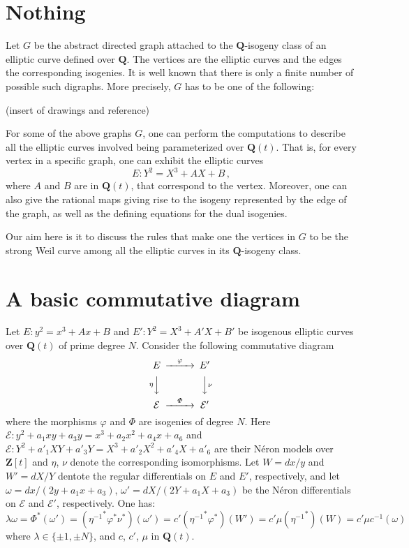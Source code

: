 \documentclass[
  journal=small,
  manuscript=article-type,  %
  year=2020,
  volume=37,
]{cup-journal}
\begin{document}
\section{Nothing}


Let $G$ be the abstract directed graph attached to the $\mathbf Q$-isogeny class of an elliptic curve defined over $\mathbf Q$. The vertices are the elliptic curves and the edges the
corresponding isogenies. It is well known that there is only a finite number of possible such digraphs. More precisely, $G$ has to be one of the following:

(insert of drawings and reference)

For some of the above graphs $G$, one can perform the computations to describe all the elliptic curves involved being parameterized over $\mathbf{Q}(t)$. That is, for every vertex in a specific graph, one can exhibit the elliptic curves
$$
E\colon Y^2 = X^3 + A X + B\,,
$$
where $A$ and $B$ are in $\mathbf{Q}(t)$, that correspond to the vertex. Moreover, one can also give the rational maps giving rise to the isogeny represented by the edge of the graph, as well as the defining equations for the dual isogenies.

Our aim here is it to discuss the rules that make one the vertices in $G$ to be the strong Weil curve among all the elliptic curves in its $\mathbf Q$-isogeny class.

\section{A basic commutative diagram}

Let $E\colon y^2 = x^3+A x+B$ and $E'\colon Y^2 = X^3+A' X+B'$ be isogenous elliptic curves over $\mathbf{Q}(t)$ of prime degree $N$.
Consider the following commutative diagram
\begin{equation}
\begin{CD}
E
 @>\varphi>>
 E'\\
@V{\eta}VV
 @VV{\nu}V\\
{\mathcal E}
 @>\varPhi>> 
 {\mathcal E}'
\end{CD}
\end{equation}
where the morphisms $\varphi$ and $\varPhi$ are isogenies of degree $N$. Here
${\mathcal E} \colon y^2+a_1xy+a_3y=x^3+a_2x^2+a_4x+a_6$ and 
${\mathcal E}\colon  Y^2+a'_1XY+a'_3Y=X^3+a'_2X^2+a'_4 X+a'_6$ are their N\'eron models over ${\mathbf Z}[t]$
and $\eta$, $\nu$ denote the corresponding isomorphisms. 
Let $W=dx/y$ and $W'=dX/Y$ dentote the regular differentials on $E$ and $E'$, respectively, and let 
$\omega=dx/(2y+a_1x+a_3)$, $\omega'=dX/(2Y+a_1X+a_3)$ be the N\'eron differentials on $\mathcal E$ and $\mathcal E'$, respectively. 
One has:
$$
\lambda \omega = \varPhi^*(\omega')= ({\eta^{-1}}^*\varphi^*\nu^*)(\omega') = 
c' ({\eta^{-1}}^*\varphi^*)(W') = 
c' \mu ({\eta^{-1}}^*)(W) = 
c' \mu c^{-1} (\omega) 
$$
where $\lambda \in \{\pm 1,\pm N\}$, and $c$, $c'$, $\mu$ in ${\mathbf Q}(t)$. 
\end{document}
